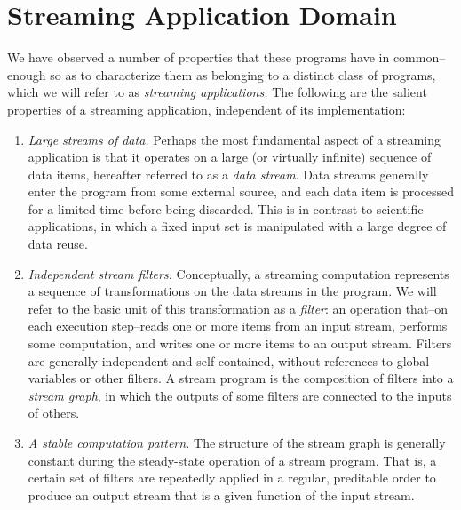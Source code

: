 \section{Streaming Application Domain}
\label{sec:domain}



We have observed a number of properties that these programs have in
common--enough so as to characterize them as belonging to a distinct
class of programs, which we will refer to as {\it streaming
applications.}  The following are the salient properties of a
streaming application, independent of its implementation:

\begin{enumerate}

\item {\it Large streams of data.}  Perhaps the most fundamental
aspect of a streaming application is that it operates on a large (or
virtually infinite) sequence of data items, hereafter referred to as a
{\it data stream}.  Data streams generally enter the program from some
external source, and each data item is processed for a limited time
before being discarded.  This is in contrast to scientific
applications, in which a fixed input set is manipulated with a large
degree of data reuse.

\item {\it Independent stream filters.}  Conceptually, a streaming computation
represents a sequence of transformations on the data streams in the
program.  We will refer to the basic unit of this transformation as a
{\it filter}: an operation that--on each execution step--reads one or
more items from an input stream, performs some computation, and writes
one or more items to an output stream.  Filters are generally
independent and self-contained, without references to global variables
or other filters.  A stream program is the composition of filters into
a {\it stream graph}, in which the outputs of some filters are
connected to the inputs of others.

\item {\it A stable computation pattern.}  The structure of the stream
graph is generally constant during the steady-state operation of a
stream program.  That is, a certain set of filters are repeatedly
applied in a regular, preditable order to produce an output stream
that is a given function of the input stream.


\end{enumerate}
